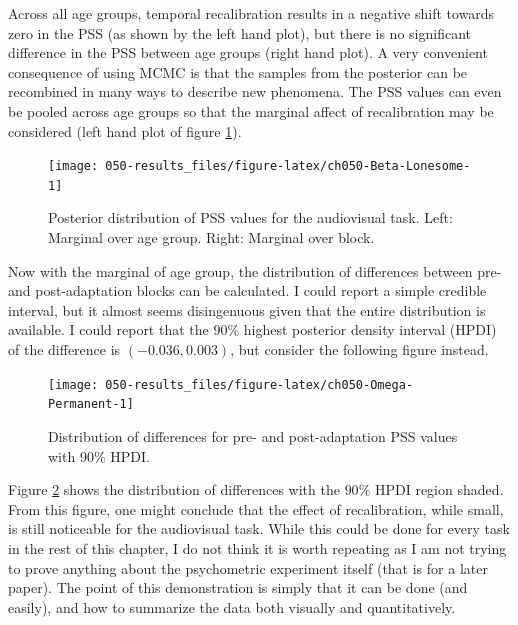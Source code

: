 \documentclass[11pt, oneside, openany]{scrbook}
\begin{document}
Across all age groups, temporal recalibration results in a negative shift towards zero in the PSS (as shown by the left hand plot), but there is no significant difference in the PSS between age groups (right hand plot). A very convenient consequence of using MCMC is that the samples from the posterior can be recombined in many ways to describe new phenomena. The PSS values can even be pooled across age groups so that the marginal affect of recalibration may be considered (left hand plot of figure \ref{fig:ch050-Beta-Lonesome}).

\begin{figure}

{\centering \texttt{[image: 050-results\_files/figure-latex/ch050-Beta-Lonesome-1]} 

}

\caption{Posterior distribution of PSS values for the audiovisual task. Left: Marginal over age group. Right: Marginal over block.}\label{fig:ch050-Beta-Lonesome}
\end{figure}

Now with the marginal of age group, the distribution of differences between pre- and post-adaptation blocks can be calculated. I could report a simple credible interval, but it almost seems disingenuous given that the entire distribution is available. I could report that the \(90\%\) highest posterior density interval (HPDI) of the difference is \((-0.036, 0.003)\), but consider the following figure instead.

\begin{figure}

{\centering \texttt{[image: 050-results\_files/figure-latex/ch050-Omega-Permanent-1]} 

}

\caption{Distribution of differences for pre- and post-adaptation PSS values with 90\% HPDI.}\label{fig:ch050-Omega-Permanent}
\end{figure}

Figure \ref{fig:ch050-Omega-Permanent} shows the distribution of differences with the \(90\%\) HPDI region shaded. From this figure, one might conclude that the effect of recalibration, while small, is still noticeable for the audiovisual task. While this could be done for every task in the rest of this chapter, I do not think it is worth repeating as I am not trying to prove anything about the psychometric experiment itself (that is for a later paper). The point of this demonstration is simply that it can be done (and easily), and how to summarize the data both visually and quantitatively.
\end{document}
